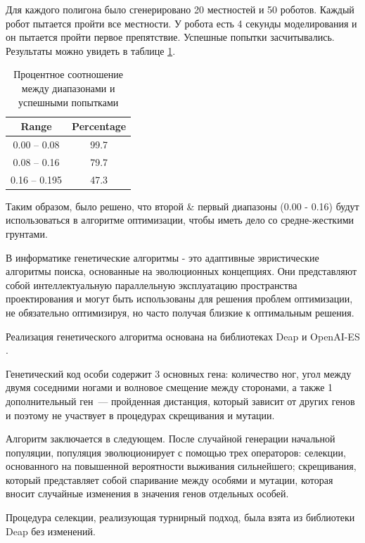Для каждого полигона было сгенерировано 20 местностей и 50 роботов. Каждый робот пытается пройти все местности. У робота есть 4 секунды моделирования и он пытается пройти первое препятствие. Успешные попытки засчитывались. Результаты можно увидеть в таблице \ref{tabular:ranges}.

\begin{table}[H]
\caption{Процентное соотношение между диапазонами и успешными попытками}
\label{tabular:ranges}
\centering
\begin{tabular}{c|c}
 \textbf{Range} & \textbf{Percentage}\\
 \hline
0.00 -- 0.08 & 99.7 \\ 
0.08 -- 0.16 & 79.7 \\
0.16 -- 0.195 & 47.3 \\
\end{tabular}
\end{table}


Таким образом, было решено, что второй \& первый диапазоны (0.00 - 0.16) будут использоваться в алгоритме оптимизации, чтобы иметь дело со средне-жесткими грунтами.

В информатике генетические алгоритмы - это адаптивные эвристические алгоритмы поиска, основанные на эволюционных концепциях. Они представляют собой интеллектуальную параллельную эксплуатацию пространства проектирования и могут быть использованы для решения проблем оптимизации, не обязательно оптимизируя, но часто получая близкие к оптимальным решения. 

Реализация генетического алгоритма основана на библиотеках Deap  и OpenAI-ES \cite{DEAP_JMLR2012,salimans_Evolution_2017}.

Генетический код особи содержит 3 основных гена: количество ног, угол между двумя соседними ногами и волновое смещение между сторонами, а также 1 дополнительный ген~--- пройденная дистанция, который зависит от других генов и поэтому не участвует в процедурах скрещивания и мутации. 

Алгоритм заключается в следующем. После случайной генерации начальной популяции, популяция эволюционирует с помощью трех операторов: селекции, основанного на повышенной вероятности выживания сильнейшего; скрещивания, который представляет собой спаривание между особями и мутации, которая вносит случайные изменения в значения генов отдельных особей.

Процедура селекции, реализующая турнирный подход, была взята из библиотеки Deap без изменений. 

